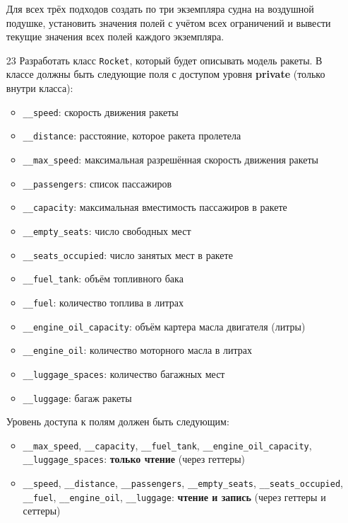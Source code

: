 \begin{enumerate}
\begin{enumerate}
\end{enumerate}
Для всех трёх подходов создать по три экземпляра судна на воздушной подушке, установить значения полей с учётом всех ограничений и вывести текущие значения всех полей каждого экземпляра.
\item[23] Разработать класс \texttt{Rocket}, который будет описывать модель ракеты. В классе должны быть следующие поля с доступом уровня \textbf{private} (только внутри класса):
\begin{itemize}
    \item \texttt{\_\_speed}: скорость движения ракеты  
    \item \texttt{\_\_distance}: расстояние, которое ракета пролетела  
    \item \texttt{\_\_max\_speed}: максимальная разрешённая скорость движения ракеты  
    \item \texttt{\_\_passengers}: список пассажиров  
    \item \texttt{\_\_capacity}: максимальная вместимость пассажиров в ракете  
    \item \texttt{\_\_empty\_seats}: число свободных мест  
    \item \texttt{\_\_seats\_occupied}: число занятых мест в ракете  
    \item \texttt{\_\_fuel\_tank}: объём топливного бака  
    \item \texttt{\_\_fuel}: количество топлива в литрах  
    \item \texttt{\_\_engine\_oil\_capacity}: объём картера масла двигателя (литры)  
    \item \texttt{\_\_engine\_oil}: количество моторного масла в литрах  
    \item \texttt{\_\_luggage\_spaces}: количество багажных мест  
    \item \texttt{\_\_luggage}: багаж ракеты  
\end{itemize}
Уровень доступа к полям должен быть следующим:
\begin{itemize}
    \item \texttt{\_\_max\_speed}, \texttt{\_\_capacity}, \texttt{\_\_fuel\_tank}, \texttt{\_\_engine\_oil\_capacity}, \texttt{\_\_luggage\_spaces}: \textbf{только чтение} (через геттеры)  
    \item \texttt{\_\_speed}, \texttt{\_\_distance}, \texttt{\_\_passengers}, \texttt{\_\_empty\_seats}, \texttt{\_\_seats\_occupied}, \texttt{\_\_fuel}, \texttt{\_\_engine\_oil}, \texttt{\_\_luggage}: \textbf{чтение и запись} (через геттеры и сеттеры)
\end{itemize}

\end{enumerate}
